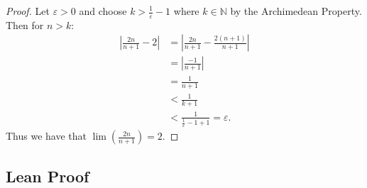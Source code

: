 \documentclass[
  letterpaper,
]{scrreprt}
\newcommand{\excl}[1]{}
\theoremstyle{remark}
\begin{document}
\begin{proof}

Let \(\varepsilon > 0\) and choose \(k > \frac{1}{\varepsilon} - 1\)
where \(k \in \mathbb{N}\) by the Archimedean Property. Then for
\(n > k:\) \begin{align*}
\left|\frac{2n}{n + 1} - 2\right| & = \left|\frac{2n}{n + 1} - \frac{2(n + 1)}{n + 1}\right|\\
& = \left|\frac{-1}{n + 1}\right|\\
& = \frac{1}{n + 1}\\
& < \frac{1}{k + 1}\\
& < \frac{1}{\frac{1}{\varepsilon} - 1 + 1} = \varepsilon.
\end{align*} Thus we have that \(\lim(\frac{2n}{n + 1}) = 2.\)
\excl{~□}\qedhere

\end{proof}

\hypertarget{lean-proof-3}{%
\subsection{Lean Proof}\label{lean-proof-3}}
\end{document}
